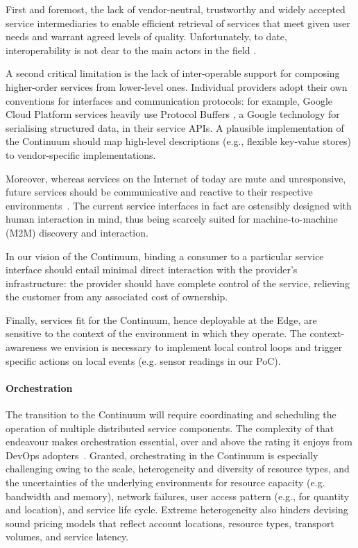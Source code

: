 First and foremost, the lack of vendor-neutral, trustworthy and widely accepted service intermediaries to enable efficient retrieval of services that meet given user needs and warrant agreed levels of quality. Unfortunately, to date, interoperability is not dear to the main actors in the field \cite{grozev2014inter}.

A second critical limitation is the lack of inter-operable support for composing higher-order services from lower-level ones. 
Individual providers adopt their own conventions for interfaces and communication protocols: for example, Google Cloud Platform services heavily use Protocol Buffers \cite{protobuf}, a Google technology for serialising structured data, in their service APIs. 
A plausible implementation of the Continuum should map high-level descriptions (e.g., flexible key-value stores) to vendor-specific implementations.

Moreover, whereas services on the Internet of today are mute and unresponsive, future services should be communicative and reactive to their respective environments~\cite{haller2008internet}. 
The current service interfaces in fact are ostensibly designed with human interaction in mind, thus being scarcely suited for machine-to-machine (M2M) discovery and interaction. 

In our vision of the Continuum, binding a consumer to a particular service interface should entail minimal direct interaction with the provider's infrastructure: the provider should have complete control of the service, relieving the customer from any associated cost of ownership.

Finally, services fit for the Continuum, hence deployable at the Edge, are sensitive to the context of the environment in which they operate.
The context-awareness we envision is necessary to implement local control loops and trigger specific actions on local events (e.g. sensor readings in our PoC).

\paragraph{Orchestration}
The transition to the Continuum will require coordinating and scheduling the operation of multiple distributed service components. The complexity of that endeavour makes orchestration essential, over and above the rating it enjoys from DevOps adopters~\cite{nygren2010akamai}. 
Granted, orchestrating in the Continuum is especially challenging owing to the scale, heterogeneity and diversity of resource types, and the uncertainties of the underlying environments for resource capacity (e.g. bandwidth and memory), network failures, user access pattern (e.g., for quantity and location), and service life cycle.
Extreme heterogeneity also hinders devising sound pricing models that reflect account locations, resource types, transport volumes, and service latency.

